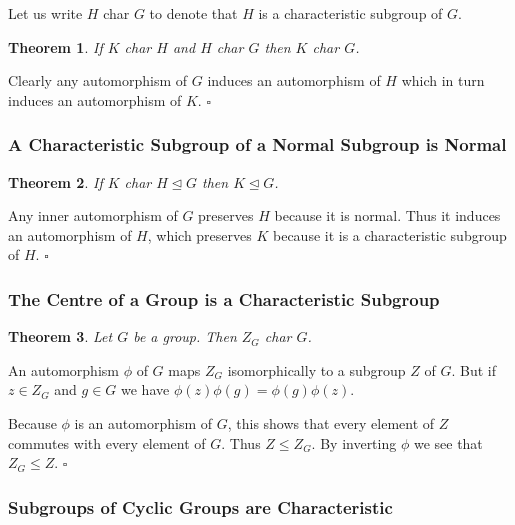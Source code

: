 \documentclass[10pt]{article}
\newtheorem{theorem}{Theorem}[section]
\newenvironment{proof}[1][Proof]{\begin{trivlist}
\item[\hskip \labelsep {\itshape #1}]}{\end{trivlist}}
\begin{document}
Let us write $H$ char $G$ to denote that $H$ is a characteristic subgroup of $G$.

\begin{theorem}
If $K$ char $H$ and $H$ char $G$ then $K$ char $G$.
\end{theorem}

\begin{proof}
Clearly any automorphism of $G$ induces an automorphism of $H$ which in turn induces an automorphism of $K$. $\square$
\end{proof}

\subsubsection{A Characteristic Subgroup of a Normal Subgroup is Normal}

\begin{theorem}
If $K$ char $H \mathrel{\unlhd} G$ then $K \mathrel{\unlhd} G$.
\end{theorem}

\begin{proof}
Any inner automorphism of $G$ preserves $H$ because it is normal. Thus it induces an automorphism of $H$, which preserves $K$ because it is a characteristic subgroup of $H$. $\square$
\end{proof}

\subsubsection{The Centre of a Group is a Characteristic Subgroup}

\begin{theorem}
Let $G$ be a group. Then $Z_G$ char $G$.
\end{theorem}

\begin{proof}
An automorphism $\phi$ of $G$ maps $Z_G$ isomorphically to a subgroup $Z$ of $G$. But if $z \in Z_G$ and $g \in G$ we have $\phi(z)\phi(g) = \phi(g)\phi(z)$.

Because $\phi$ is an automorphism of $G$, this shows that every element of $Z$ commutes with every element of $G$. Thus $Z \leq Z_G$. By inverting $\phi$ we see that $Z_G \leq Z$. $\square$
\end{proof}

\subsubsection{Subgroups of Cyclic Groups are Characteristic}
\end{document}
